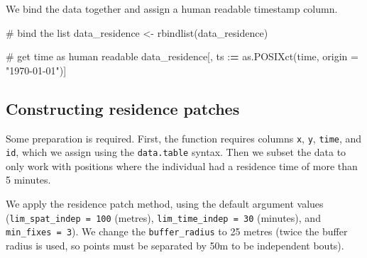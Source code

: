 \documentclass[]{scrreprt}
\newenvironment{Shaded}{}{}
\newcommand{\CommentTok}[1]{\textcolor[rgb]{0.00,0.50,0.00}{#1}}
\newcommand{\DataTypeTok}[1]{#1}
\newcommand{\DecValTok}[1]{#1}
\newcommand{\ErrorTok}[1]{\textcolor[rgb]{1.00,0.00,0.00}{\textbf{#1}}}
\newcommand{\KeywordTok}[1]{\textcolor[rgb]{0.00,0.00,1.00}{#1}}
\newcommand{\NormalTok}[1]{#1}
\newcommand{\OperatorTok}[1]{#1}
\newcommand{\StringTok}[1]{\textcolor[rgb]{0.00,0.50,0.50}{#1}}
\begin{document}
We bind the data together and assign a human readable timestamp column.

\begin{Shaded}
\begin{Highlighting}[]
\CommentTok{# bind the list}
\NormalTok{data_residence <-}\StringTok{ }\KeywordTok{rbindlist}\NormalTok{(data_residence)}

\CommentTok{# get time as human readable}
\NormalTok{data_residence[, ts }\OperatorTok{:}\ErrorTok{=}\StringTok{ }\KeywordTok{as.POSIXct}\NormalTok{(time, }\DataTypeTok{origin =} \StringTok{"1970-01-01"}\NormalTok{)]}
\end{Highlighting}
\end{Shaded}

\hypertarget{constructing-residence-patches}{%
\subsection{Constructing residence patches}\label{constructing-residence-patches}}

Some preparation is required. First, the function requires columns \texttt{x}, \texttt{y},
\texttt{time}, and \texttt{id}, which we assign using the \texttt{data.table} syntax.
Then we subset the data to only work with positions where the individual had a residence time of more than 5 minutes.

\begin{Shaded}
\end{Shaded}

We apply the residence patch method, using the default argument values (\texttt{lim\_spat\_indep\ =\ 100} (metres), \texttt{lim\_time\_indep\ =\ 30} (minutes), and \texttt{min\_fixes\ =\ 3}). We change the \texttt{buffer\_radius} to 25 metres (twice the buffer radius is used, so points must be separated by 50m to be independent bouts).
\end{document}
